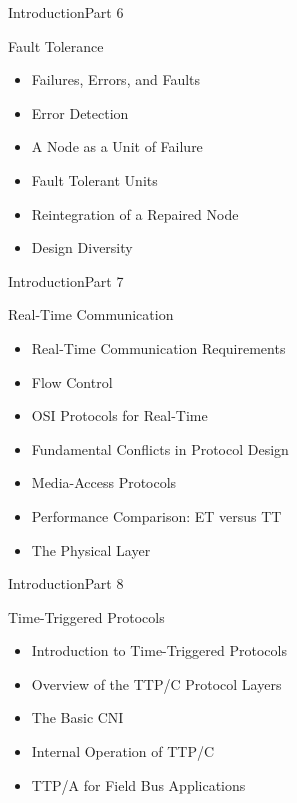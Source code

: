 \begin{frame}{Introduction}{Part 6}
    \begin{block}{Fault Tolerance}
\begin{itemize}
\item
  Failures, Errors, and Faults
\item
  Error Detection
\item
  A Node as a Unit of Failure
\item
  Fault Tolerant Units
\item
  Reintegration of a Repaired Node
\item
  Design Diversity
\end{itemize}
\end{block}
\end{frame}


\begin{frame}{Introduction}{Part 7}
    \begin{block}{Real-Time Communication}
\begin{itemize}
\item
  Real-Time Communication Requirements
\item
  Flow Control
\item
  OSI Protocols for Real-Time
\item
  Fundamental Conflicts in Protocol Design
\item
  Media-Access Protocols
\item
  Performance Comparison: ET versus TT
\item
  The Physical Layer
\end{itemize}
\end{block}
\end{frame}


\begin{frame}{Introduction}{Part 8}
    \begin{block}{Time-Triggered Protocols}
\begin{itemize}
\item
  Introduction to Time-Triggered Protocols
\item
  Overview of the TTP/C Protocol Layers
\item
  The Basic CNI
\item
  Internal Operation of TTP/C
\item
  TTP/A for Field Bus Applications
\end{itemize}
\end{block}
\end{frame}


